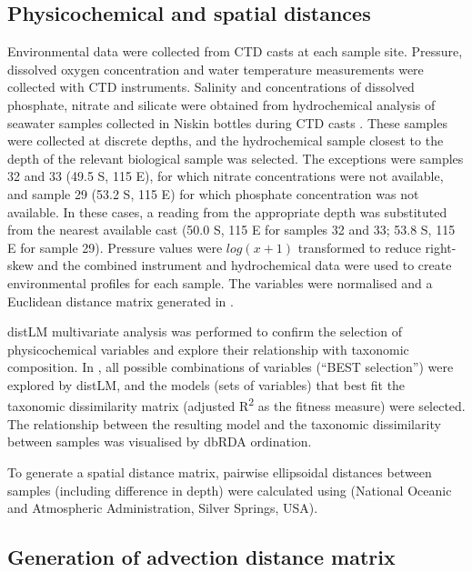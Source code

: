 \subsection{Physicochemical and spatial distances}

Environmental data were collected from \ac{CTD} casts at each sample site.
Pressure, dissolved oxygen concentration and water temperature measurements were collected with \ac{CTD} instruments.
Salinity and concentrations of dissolved phosphate, nitrate and silicate were obtained from hydrochemical analysis of seawater samples collected in Niskin bottles during \ac{CTD} casts \cite{Rosenberg:2012vs}.
These samples were collected at discrete depths, and the hydrochemical sample closest to the depth of the relevant biological sample was selected.
The exceptions were samples 32 and 33 (49.5\textdegree{} S, 115\textdegree{} E), for which nitrate concentrations were not available, and sample 29 (53.2\textdegree{} S, 115\textdegree{} E) for which phosphate concentration was not available.
In these cases, a reading from the appropriate depth was substituted from the nearest available cast (50.0\textdegree{} S, 115\textdegree{} E for samples 32 and 33; 53.8\textdegree{} S, 115\textdegree{} E for sample 29).
Pressure values were $log(x+1)$ transformed to reduce right-skew \cite{Clarke:2011tn} and the combined instrument and hydrochemical data were used to create environmental profiles for each sample.
The variables were normalised and a Euclidean distance matrix generated in .

\ac{distLM} multivariate analysis \cite{Legendre:1999tj} was performed to confirm the selection of physicochemical variables and explore their relationship with taxonomic composition.
In , all possible combinations of variables (``BEST selection'') were explored by \ac{distLM}, and the models (sets of variables) that best fit the taxonomic dissimilarity matrix (adjusted R\textsuperscript{2} as the fitness measure) were selected.
The relationship between the resulting model and the taxonomic dissimilarity between samples was visualised by \ac{dbRDA} ordination.

To generate a spatial distance matrix, pairwise ellipsoidal distances between samples (including difference in depth) were calculated using  (National Oceanic and Atmospheric Administration, Silver Springs, USA).

\subsection{Generation of advection distance matrix}

